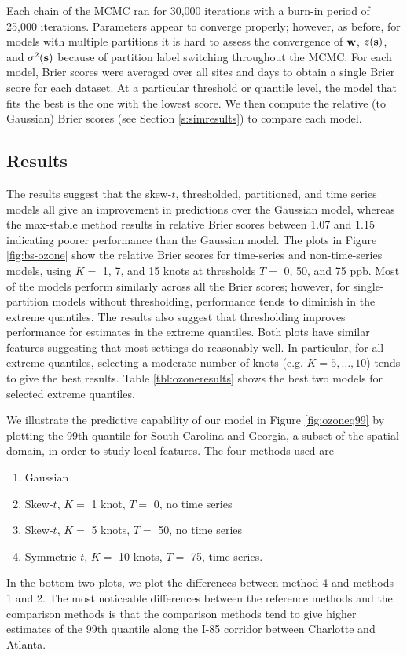 \documentclass[11pt]{article}
\begin{document}
Each chain of the MCMC ran for 30,000 iterations with a burn-in period of 25,000 iterations.
Parameters appear to converge properly; however, as before, for models with multiple partitions it is hard to assess the convergence of $\mbox{\bf w}$, $z(\mbox{\bf s})$, and $\sigma^2(\mbox{\bf s})$ because of partition label switching throughout the MCMC.
For each model, Brier scores were averaged over all sites and days to obtain a single Brier score for each dataset.
At a particular threshold or quantile level, the model that fits the best is the one with the lowest score.
We then compute the relative (to Gaussian) Brier scores (see Section \ref{s:simresults}) to compare each model.

\subsection{Results}\label{s:results}
The results suggest that the skew-$t$, thresholded, partitioned, and time series models all give an improvement in predictions over the Gaussian model, whereas the max-stable method results in relative Brier scores between 1.07 and 1.15 indicating poorer performance than the Gaussian model.
The plots in Figure \ref{fig:bs-ozone} show the relative Brier scores for time-series and non-time-series models, using $K = $ 1, 7, and 15 knots at thresholds $T = $ 0, 50, and 75 ppb.
Most of the models perform similarly across all the Brier scores; however, for single-partition models without thresholding, performance tends to diminish in the extreme quantiles.
The results also suggest that thresholding improves performance for estimates in the extreme quantiles.
Both plots have similar features suggesting that most settings do reasonably well.
In particular, for all extreme quantiles, selecting a moderate number of knots (e.g. $K = 5, \ldots, 10$) tends to give the best results.
Table \ref{tbl:ozoneresults} shows the best two models for selected extreme quantiles.

We illustrate the predictive capability of our model in Figure \ref{fig:ozoneq99} by plotting the 99th quantile for South Carolina and Georgia, a subset of the spatial domain, in order to study local features.
The four methods used are
\begin{enumerate}\setlength{\itemsep}{-0.5em}
  \item Gaussian
  \item Skew-$t$, $K =$ 1 knot, $T = $ 0, no time series
  \item Skew-$t$, $K =$ 5 knots, $T = $ 50, no time series
  \item Symmetric-$t$, $K =$ 10 knots, $T = $ 75, time series.
\end{enumerate}
In the bottom two plots, we plot the differences between method 4 and methods 1 and 2.
The most noticeable differences between the reference methods and the comparison methods is that the comparison methods tend to give higher estimates of the 99th quantile along the I-85 corridor between Charlotte and Atlanta.
\end{document}
